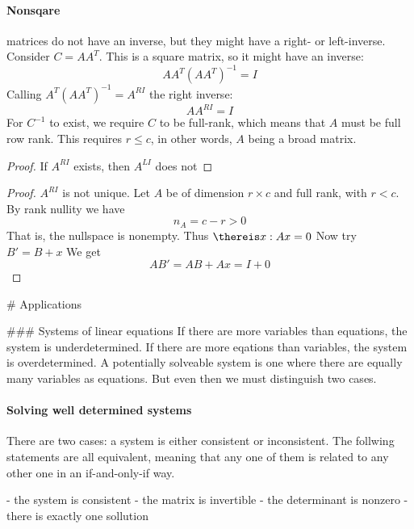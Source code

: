 \paragraph{Nonsqare} matrices do not have an inverse, but they might have a right- or left-inverse.
Consider $C = A A^T$. This is a square matrix, so it might have an inverse:
$$ A A^T (A A^T)^{-1} = I $$
Calling $A^T (A A^T)^{-1} = A^{RI}$ the right inverse:
$$ A A^{RI} = I $$
For $C^{-1}$ to exist, we require $C$ to be full-rank, which means that $A$ must be full row rank. This  requires $r \leq c$, in other words, $A$ being a broad matrix.

\begin{proof}
If $A^{RI}$ exists, then $A^{LI}$ does not
\end{proof}

\begin{proof}
    $A^{RI}$ is not unique.
    Let $A$ be of dimension $r \times c$ and full rank, with $r < c$. By rank nullity we have
    $$ n_A = c - r > 0 $$
    That is, the nullspace is nonempty. Thus $\thereis x : Ax = 0$
    Now try $B' = B + x$
    We get 
    $$ AB' = AB + Ax = I + 0$$
\end{proof}


















# Applications


### Systems of linear equations
If there are more variables than equations, the system is underdetermined. If there are more eqations than variables, the system is overdetermined. A potentially solveable system is one where there are equally many variables as equations. But even then we must distinguish two cases. 

\paragraph{Solving well determined systems}
There are two cases: a system is either consistent or inconsistent. The follwing statements are all equivalent, meaning that any one of them is related to any other one in an if-and-only-if way. 


    - the system is consistent
    - the matrix is invertible
    - the determinant is nonzero
    - there is exactly one sollution



